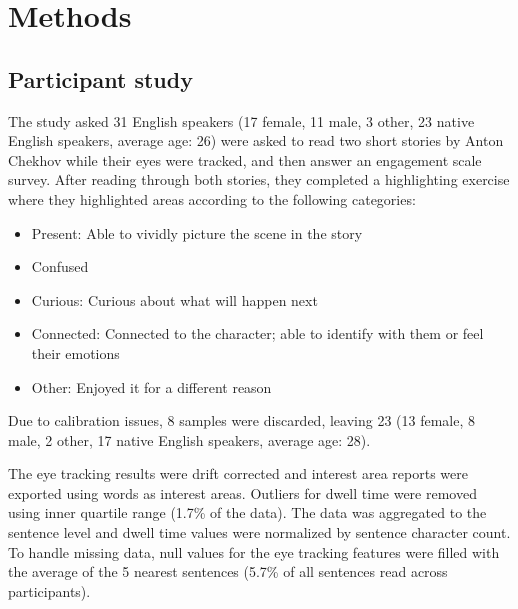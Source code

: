 \documentclass[11pt]{article}
\begin{document}
\section{Methods}

\subsection{Participant study}

The study asked 31 English speakers (17 female, 11 male, 3 other, 23 native English speakers, average age: 26) were asked to read two short stories by Anton Chekhov while their eyes were tracked, and then answer an engagement scale survey. After reading through both stories, they completed a highlighting exercise where they highlighted areas according to the following categories:

\begin{itemize}
  \item Present: Able to vividly picture the scene in the story
  \item Confused
  \item Curious: Curious about what will happen next
  \item Connected: Connected to the character; able to identify with them or feel their emotions
  \item Other: Enjoyed it for a different reason
\end{itemize}

Due to calibration issues, 8 samples were discarded, leaving 23 (13 female, 8 male, 2 other, 17 native English speakers, average age: 28).

The eye tracking results were drift corrected and interest area reports were exported using words as interest areas. Outliers for dwell time were removed using inner quartile range (1.7\% of the data). The data was aggregated to the sentence level and dwell time values were normalized by sentence character count. To handle missing data, null values for the eye tracking features were filled with the average of the 5 nearest sentences (5.7\% of all sentences read across participants).
\end{document}
